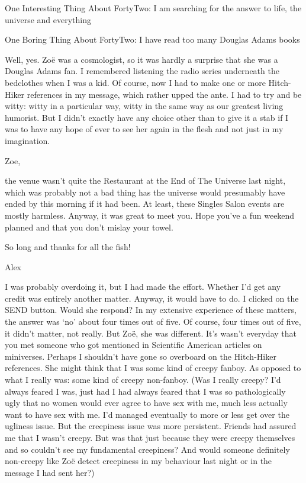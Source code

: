 One Interesting Thing About FortyTwo: I am searching for the answer
to life, the universe and everything

One Boring Thing About FortyTwo: I have read too many Douglas Adams
books

Well, yes. Zoë was a cosmologist, so it was hardly a surprise
that she was a Douglas Adams fan. I remembered listening the radio
series underneath the bedclothes when I was a kid. Of course, now I
had to make one or more {\twelvesl Hitch-Hiker\/} references in my
message, which rather upped the ante. I had to try and be witty:
witty in a particular way, witty in the same way as our greatest
living humorist. But I didn't exactly have any choice other than to
give it a stab if I was to have any hope of ever to see her again in
the flesh and not just in my imagination.

\startmessage
Zoe,

the venue wasn't quite the Restaurant at the End of The Universe
last night, which was probably not a bad thing has the universe
would presumably have ended by this morning if it had been. At
least, these Singles Salon events are mostly harmless. Anyway, it
was great to meet you. Hope you've a fun weekend planned and that
you don't mislay your towel.

So long and thanks for all the fish!

Alex
\stopmessage

I was probably overdoing it, but I had made the effort. Whether I'd
get any credit was entirely another matter. Anyway, it would have to
do. I clicked on the {\twelvess SEND} button. Would she respond? In my extensive
experience of these matters, the answer was `no' about four times
out of five. Of course, four times out of five, it didn't matter,
not really. But Zoë, she was different. It's wasn't everyday
that you met someone who got mentioned in {\twelvesl Scientific
American\/} articles on miniverses. Perhaps I shouldn't have gone so
overboard on the {\twelvesl Hitch-Hiker\/} references. She might
think that I was some kind of creepy fanboy. As opposed to what I
really was: some kind of creepy non-fanboy. (Was I really creepy?
I'd always feared I was, just had I had always feared that I was so
pathologically ugly that no women would ever agree to have sex with
me, much less actually {\twelveit want\/} to have sex with me. I'd
managed eventually to more or less get over the ugliness issue. But
the creepiness issue was more persistent. Friends had assured me
that I wasn't creepy. But was that just because they were creepy
themselves and so couldn't see my fundamental creepiness? And would
someone definitely non-creepy like Zoë detect creepiness in my
behaviour last night or in the message I had sent her?)


